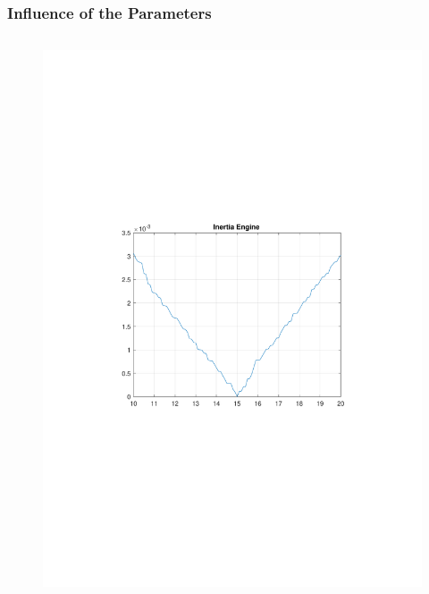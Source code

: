\documentclass[table]{beamer}
\begin{document}
\begin{frame}[c]
	\frametitle{Influence of the Parameters}
	\vspace{-.5cm}
	\begin{columns}[c]
			\begin{figure}
				\centering
				\includegraphics[trim=4cm 9cm 4cm 9.5cm, clip=true, width=\linewidth]{img/inertia_engine}
				\vskip 0mm

\end{figure}
\end{columns}
\end{frame}
\end{document}
